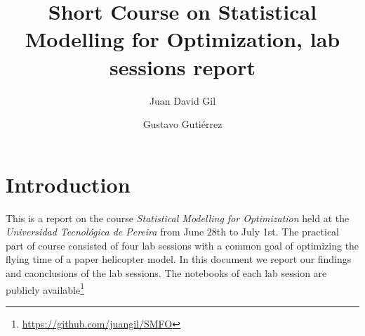 \documentclass[DIV=20]{scrartcl}
\title{Short Course on Statistical Modelling for Optimization, lab sessions
report}
\author{Juan David Gil \and Gustavo Gutiérrez}
\date{}
\begin{document}
\maketitle
\section{Introduction}
This is a report on the course \emph{Statistical Modelling for Optimization}
held at the \emph{Universidad Tecnológica de Pereira} from June 28th to July
1st. The practical part of course consisted of four lab sessions with a common
goal of optimizing the flying time of a paper helicopter model. In this document
we report our findings and caonclusions of the lab sessions. The notebooks of
each lab session are publicly
available\footnote{\url{https://github.com/juangil/SMFO}}





\end{document}
